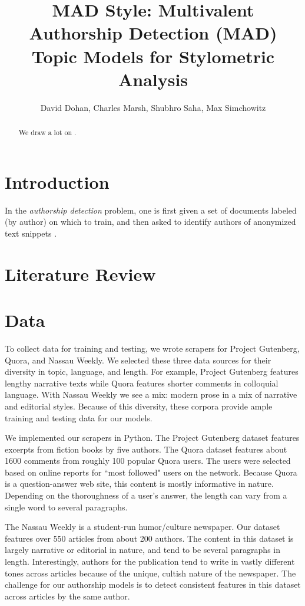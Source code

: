 \documentclass[14pt]{article} %
\title{MAD Style: Multivalent Authorship Detection (MAD) Topic Models for Stylometric Analysis}
\author{David Dohan, Charles Marsh, Shubhro Saha, Max Simchowitz}
\theoremstyle{plain}
\theoremstyle{definition}
\theoremstyle{remark}
\begin{document}
\maketitle
\large
\begin{abstract}
We draw a lot on \citep{Blei2007}.
\end{abstract}

\section{Introduction}

In the \textit{authorship detection} problem, one is first given a set of documents labeled (by author) on which to train, and then asked to identify authors of anonymized text snippets \citep{Stein}.

\section{Literature Review}

\section{Data}
To collect data for training and testing, we wrote scrapers for Project Gutenberg, Quora, and Nassau Weekly. We selected these three data sources for their diversity in topic, language, and length. For example, Project Gutenberg features lengthy narrative texts while Quora features shorter comments in colloquial language. With Nassau Weekly we see a mix: modern prose in a mix of narrative and editorial styles. Because of this diversity, these corpora provide ample training and testing data for our models.

We implemented our scrapers in Python. The Project Gutenberg dataset features excerpts from fiction books by five authors. The Quora dataset features about 1600 comments from roughly 100 popular Quora users. The users were selected based on online reports for ``most followed" users on the network. Because Quora is a question-answer web site, this content is mostly informative in nature. Depending on the thoroughness of a user's answer, the length can vary from a single word to several paragraphs.

The Nassau Weekly is a student-run humor/culture newspaper. Our dataset features over 550 articles from about 200 authors. The content in this dataset is largely narrative or editorial in nature, and tend to be several paragraphs in length. Interestingly, authors for the publication tend to write in vastly different tones across articles because of the unique, cultish nature of the newspaper. The challenge for our authorship models is to detect consistent features in this dataset across articles by the same author.
\end{document}
